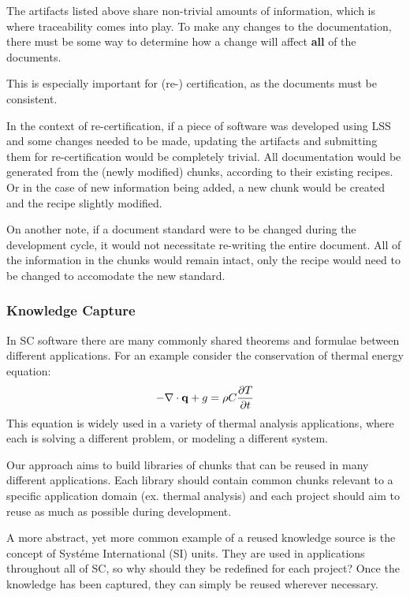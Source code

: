\documentclass{sig-alternate-05-2015}
\newcommand{\lss}{LSS}
\begin{document}
The artifacts listed above share non-trivial amounts of information, which is
where traceability comes into play. To make any changes to the documentation,
there must be some way to determine how a change will affect \textbf{all} of the
documents.

This is especially important for (re-) certification, as the documents must be
consistent.

In the context of re-certification, if a piece of software was developed using
\lss{} and some changes needed to be made, updating the artifacts and submitting
them for re-certification would be completely trivial. All documentation would
be generated from the (newly modified) chunks, according to their existing
recipes. Or in the case of new information being added, a new chunk would be
created and the recipe slightly modified.

On another note, if a document standard were to be changed during the
development cycle, it would not necessitate re-writing the entire document. All
of the information in the chunks would remain intact, only the recipe would need
to be changed to accomodate the new standard.

\subsubsection{Knowledge Capture} \label{sssec:adv_knowledge}

In SC software there are many commonly shared theorems and formulae between
different applications. For an example consider the conservation of thermal
energy equation:
\begin{displaymath} 
-{\bf \nabla \cdot q} + g = \rho C \frac{\partial T}{\partial t}
\end{displaymath} 
This
equation is widely used in a variety of thermal analysis applications, where
each is solving a different problem, or modeling a different system.

Our approach aims to build libraries of chunks that can be reused in many
different applications. Each library should contain common chunks relevant to a
specific application domain (ex. thermal analysis) and each project should aim
to reuse as much as possible during development.

A more abstract, yet more common example of a reused knowledge source is the
concept of Syst\'{e}me International (SI) units. They are used in applications
throughout all of SC, so why should they be redefined for each project? Once the
knowledge has been captured, they can simply be reused wherever necessary.
\end{document}
